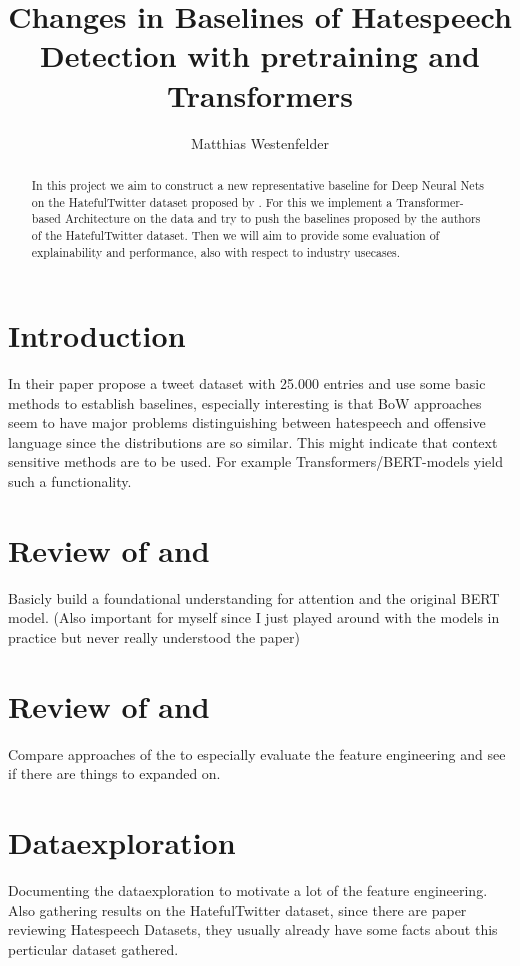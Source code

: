 \documentclass[11pt,a4paper]{article}
\title{Changes in Baselines of Hatespeech Detection with pretraining and Transformers}
\author{Matthias Westenfelder}
\begin{document}
\maketitle
\begin{abstract}
In this project we aim to construct a new representative baseline for Deep Neural Nets on the HatefulTwitter dataset proposed by \textcite{auto_hatespeech}. For this we implement a Transformer-based Architecture on the data and try to push the baselines proposed by the authors of the HatefulTwitter dataset.
Then we will aim to provide some evaluation of explainability and performance, also with respect to industry usecases.
\end{abstract}
 
\section{Introduction}
In their paper \textcite{auto_hatespeech} propose a tweet dataset with 25.000 entries and use some basic methods to establish baselines, especially interesting is that BoW approaches seem to have major problems distinguishing between hatespeech and offensive language since the distributions are so similar.
This might indicate that context sensitive methods are to be used. For example Transformers/BERT-models yield such a functionality.

\section{Review of \textcite{Attention_is_all_you_need} and \textcite{BERT}}
Basicly build a foundational understanding for attention and the original BERT model. (Also important for myself since I just played around with the models in practice but never really understood the paper)

\section{Review of \textcite{auto_hatespeech} and \textcite{BERT_Transferlearning_Hate}}
Compare approaches of the \textcite{auto_hatespeech} to \textcite{BERT_Transferlearning_Hate} especially evaluate the feature engineering and see if there are things to expanded on.

\section{Dataexploration}
Documenting the dataexploration to motivate a lot of the feature engineering.
Also gathering results on the HatefulTwitter dataset, since there are paper reviewing Hatespeech Datasets, they usually already have some facts about this perticular dataset gathered.
\end{document}
